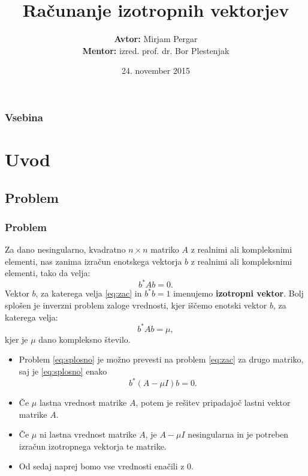 \documentclass{beamer}
\title[Računanje izotropnih vektorjev] %
{Računanje izotropnih vektorjev}
\author[Mirjam Pergar] %
{\textbf{Avtor:}  Mirjam Pergar\\
\textbf{Mentor:} izred. prof. dr. Bor Plestenjak
}
\institute[Fakuleta za matematiko in fiziko] %
{

}
\date[24. november 2015] %
{24. november 2015}
\begin{document}
\begin{frame}
  \titlepage
\end{frame}

\begin{frame}
  \frametitle{Vsebina}
  \tableofcontents[pausesections]
\end{frame}


\section{Uvod}
\subsection{Problem}
\begin{frame}
  \frametitle{Problem}
\begin{alertblock}{}
Za dano nesingularno, kvadratno $n \times n$ matriko $A$ z realnimi ali kompleksnimi elementi, nas zanima izračun enotskega vektorja $b$ z realnimi ali kompleksnimi elementi, tako da velja:
\begin{equation}\label{eq:zac}
b^\ast Ab=0.
\end{equation}
Vektor $b$, za katerega velja \eqref{eq:zac} in $b^\ast b=1$  imenujemo \textbf{izotropni vektor}. 
Bolj splošen je inverzni problem zaloge vrednosti, kjer iščemo enotski vektor $b$, za katerega velja:
\begin{equation}\label{eq:splosno}
b^\ast Ab=\mu,
\end{equation}
kjer je $\mu$ dano kompleksno število.
\end{alertblock}
\end{frame}
\begin{frame}
\begin{itemize}
\item Problem \eqref{eq:splosno} je možno prevesti na problem \eqref{eq:zac} za drugo matriko, saj je \eqref{eq:splosno} enako
$$b^\ast (A-\mu I)b=0.$$
\item Če $\mu$ lastna vrednost matrike $A$, potem je rešitev pripadajoč lastni vektor matrike $A$.
\item Če $\mu$ ni lastna vrednost matrike $A$, je $A-\mu I$ nesingularna in je potreben izračun izotropnega vektorja te matrike.
\item Od sedaj naprej bomo vse vrednosti enačili z $0$.
\end{itemize}
\end{frame}
\end{document}

